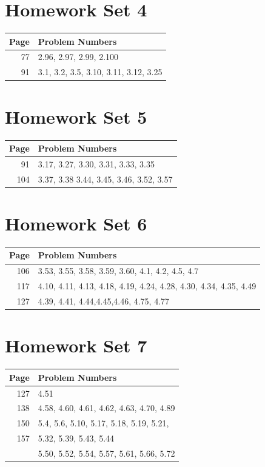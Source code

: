 \documentclass{book}
\begin{document}
\section{Homework Set 4}
\begin{tabular}{r|l}
Page & Problem Numbers\\
\hline
77 & 2.96, 2.97, 2.99, 2.100\\
91 & 3.1, 3.2, 3.5, 3.10, 3.11, 3.12, 3.25\\
\end{tabular}

\section{Homework Set 5}
\begin{tabular}{r|l}
Page & Problem Numbers\\
\hline
91 & 3.17, 3.27, 3.30, 3.31, 3.33, 3.35\\
104 & 3.37, 3.38 3.44, 3.45, 3.46, 3.52, 3.57\\
\end{tabular}

\section{Homework Set 6}
\begin{tabular}{r|l}
Page & Problem Numbers\\
\hline
106 & 3.53, 3.55, 3.58, 3.59, 3.60, 4.1, 4.2, 4.5, 4.7\\
117 & 4.10, 4.11, 4.13, 4.18, 4.19, 4.24, 4.28, 4.30, 4.34, 4.35, 4.49\\
127 & 4.39, 4.41, 4.44,4.45,4.46, 4.75, 4.77\\
\end{tabular}

\section{Homework Set 7}
\begin{tabular}{r|l}
Page & Problem Numbers\\
\hline
127 & 4.51\\
138 & 4.58, 4.60, 4.61, 4.62, 4.63, 4.70, 4.89\\
150 & 5.4, 5.6, 5.10, 5.17, 5.18, 5.19, 5.21,\\
157 & 5.32, 5.39, 5.43, 5.44\\
& 5.50, 5.52, 5.54, 5.57, 5.61, 5.66, 5.72\\
\end{tabular}


\newpage
\nocite{textbook}
\printbibliography
\end{document}
